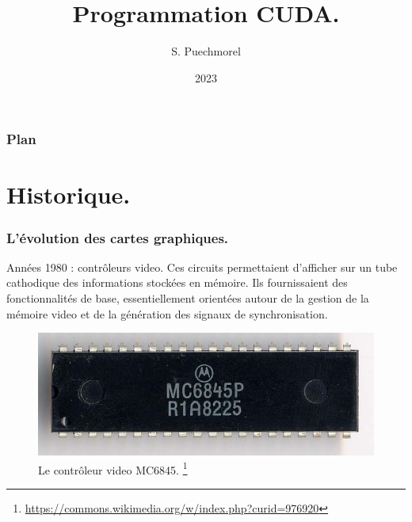 \documentclass{beamer}
\title{Programmation CUDA.}
\author{S. Puechmorel}
\date{2023}
\begin{document}
\begin{frame}
    \titlepage

\end{frame}
\begin{frame}
  \frametitle{Plan}
\tableofcontents
\end{frame}
\section{Historique.}
\begin{frame}
    \frametitle{L'évolution des cartes graphiques.}
\begin{block}{Années 1980 : contrôleurs video.}
  Ces circuits permettaient d'afficher sur un tube cathodique 
  des informations stockées en mémoire. Ils fournissaient des fonctionnalités de base, essentiellement orientées
  autour de la gestion de la mémoire video et de la génération des signaux de synchronisation. 
  \begin{figure}[ht]
    \centering
    \includegraphics[scale=0.5]{Motorola_MC6845.jpg}
    \caption{Le contrôleur video MC6845. \footnote{\tiny \url{https://commons.wikimedia.org/w/index.php?curid=976920}}}
    \label{fig:MC6845}
  \end{figure}
\end{block}
\end{frame}
\end{document}
